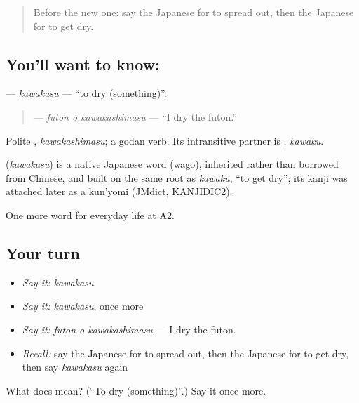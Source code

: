 \label{lesson:JA-C161-kawakasu}



\begin{quote}
Before the new one: say the Japanese for to spread out, then the Japanese for to get dry.
\end{quote}

\subsection*{You'll want to know: }
\textbf{} — \emph{kawakasu} — \textquotedblleft{}to dry (something)\textquotedblright{}.

\begin{quote}
\textbf{ } — \emph{futon o kawakashimasu} — \textquotedblleft{}I dry the futon.\textquotedblright{}
\end{quote}

Polite \textbf{}, \emph{kawakashimasu}; a godan verb. Its intransitive partner is \textbf{}, \emph{kawaku}.

\begin{cousinweb}
\textbf{} (\emph{kawakasu}) is a native Japanese word (wago), inherited rather than borrowed from Chinese, and built on the same root as \emph{kawaku}, \textquotedblleft{}to get dry\textquotedblright{}; its kanji was attached later as a kun'yomi (JMdict, KANJIDIC2).
\end{cousinweb}

\begin{grammarlens}[title={What you've built}]
One more word for everyday life at A2.
\end{grammarlens}

\subsection*{Your turn}
\begin{itemize}
\raggedright
  \item \emph{Say it:} \emph{kawakasu}
  \item \emph{Say it:} \emph{kawakasu}, once more
  \item \emph{Say it:} \emph{futon o kawakashimasu} — I dry the futon.
  \item \emph{Recall:} say the Japanese for to spread out, then the Japanese for to get dry, then say \emph{kawakasu} again
\end{itemize}

\begin{tcolorbox}[breakable,colback=teal!4,colframe=teal!35!black,title={Before you move on}]
What does  mean? (\textquotedblleft{}To dry (something)\textquotedblright{}.) Say it once more.
\end{tcolorbox}
